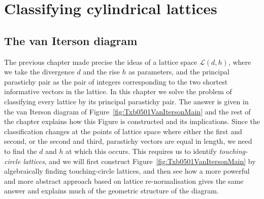 

\chapter{Classifying cylindrical lattices}
\label{ch:classifying}


\section{The van Iterson diagram}
The previous chapter made precise the ideas  of a lattice space $\mathcal{L}(d,h)$, where we take the divergence $d$ and the rise $h$ as parameters, and the principal parastichy pair as the pair of integers corresponding to the two shortest informative vectors in the lattice. In this chapter  we solve the problem of classifying every lattice by its principal parastichy pair.
The answer is given in the van Iterson diagram of Figure~\ref{fig:Txb0501VanItersonMain} and the rest of the chapter explains how this Figure is constructed and its implications. 
 Since the classification changes at the points of lattice space where either the first and second, or the second and third, parastichy vectors are equal in length, we need to find the $d$ and $h$ at which this occurs. This requires us to identify \emph{touching-circle lattices}, and we will first construct Figure~\ref{fig:Txb0501VanItersonMain} by algebraically finding touching-circle lattices, and then see how a more powerful and more abstract approach based on lattice re-normalisation gives the same answer and explains much of the geometric structure of the diagram. 
 

